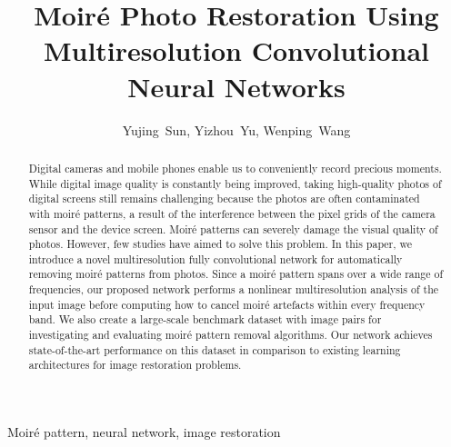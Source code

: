 \documentclass[journal]{IEEEtran}
\newcommand{\sunnie}[1]{{\color{black} #1}}
\begin{document}
\title{Moir\'{e} Photo Restoration Using Multiresolution Convolutional Neural Networks}


\author{Yujing~Sun,
        Yizhou~Yu,
       Wenping~Wang

}



















\maketitle

\begin{abstract}
Digital cameras and mobile phones enable us to conveniently record precious moments. While digital image quality is constantly being improved, taking high-quality photos of digital screens still remains challenging because the photos are often contaminated with moir\'{e} patterns, a result of the interference between the pixel grids of the camera sensor and the device screen. Moir\'{e} patterns can severely damage the visual quality of photos. 
\sunnie{However, few studies have aimed to solve this problem.}
In this paper, we introduce a novel multiresolution fully convolutional network for automatically removing moir\'{e} patterns from photos. Since a moir\'{e} pattern spans over a wide range of frequencies, our proposed network performs a nonlinear multiresolution analysis of the input image before computing how to cancel moir\'{e} artefacts within every frequency band. We also create a large-scale benchmark dataset with  image pairs for investigating and evaluating moir\'{e} pattern removal algorithms. Our network achieves state-of-the-art performance on this dataset in comparison to existing learning architectures for image restoration problems.
\end{abstract}

\begin{IEEEkeywords}
Moir\'{e} pattern, neural network, image restoration
\end{IEEEkeywords}
\end{document}
